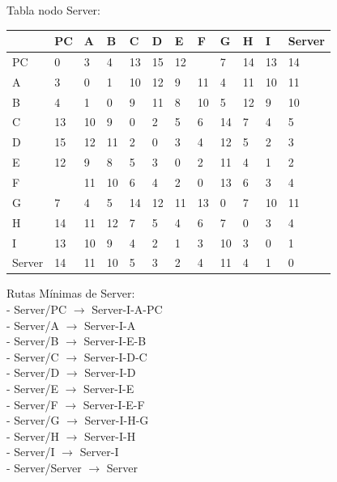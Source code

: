 \documentclass[a4paper]{article}
\begin{document}
\begin{table}[ht]
Tabla nodo Server:\\
\begin{tabular}{|l|l|l|l|l|l|l|l|l|l|l|l|}
\hline
       & PC & A  & B & C & D & E & F & G & H & I  & Server \\ \hline
PC     & 0  & 3  & 4 & 13& 15& 12&   & 7 & 14& 13 & 14     \\ \hline
A      & 3  & 0  & 1 & 10& 12& 9 & 11& 4 & 11& 10 & 11     \\ \hline
B      & 4  & 1  & 0 & 9 & 11& 8 & 10& 5 & 12& 9  & 10     \\ \hline
C      & 13 & 10 & 9 & 0 & 2 & 5 & 6 & 14& 7 & 4  & 5      \\ \hline
D      & 15 & 12 & 11& 2 & 0 & 3 & 4 & 12& 5 & 2  & 3      \\ \hline
E      & 12 & 9  & 8 & 5 & 3 & 0 & 2 & 11& 4 & 1  & 2      \\ \hline
F      &    & 11 & 10& 6 & 4 & 2 & 0 & 13& 6 & 3  & 4      \\ \hline
G      & 7  & 4  & 5 & 14& 12& 11& 13& 0 & 7 & 10 & 11     \\ \hline
H      & 14 & 11 & 12& 7 & 5 & 4 & 6 & 7 & 0 & 3  & 4      \\ \hline
I      & 13 & 10 & 9 & 4 & 2 & 1 & 3 & 10& 3 & 0  & 1      \\ \hline
Server & 14 & 11 & 10& 5 & 3 & 2 & 4 & 11& 4 & 1  & 0      \\ \hline
\end{tabular}

Rutas Mínimas de Server:\\
-	Server/PC $\rightarrow$  Server-I-A-PC\\
-	Server/A  $\rightarrow$  Server-I-A\\
-	Server/B  $\rightarrow$  Server-I-E-B\\
-	Server/C  $\rightarrow$  Server-I-D-C\\
-	Server/D  $\rightarrow$  Server-I-D\\
-	Server/E  $\rightarrow$  Server-I-E\\
-	Server/F  $\rightarrow$  Server-I-E-F\\
-	Server/G  $\rightarrow$  Server-I-H-G\\
-	Server/H  $\rightarrow$  Server-I-H\\
-	Server/I  $\rightarrow$  Server-I\\
-	Server/Server  $\rightarrow$  Server\\
\end{table}
\end{document}
